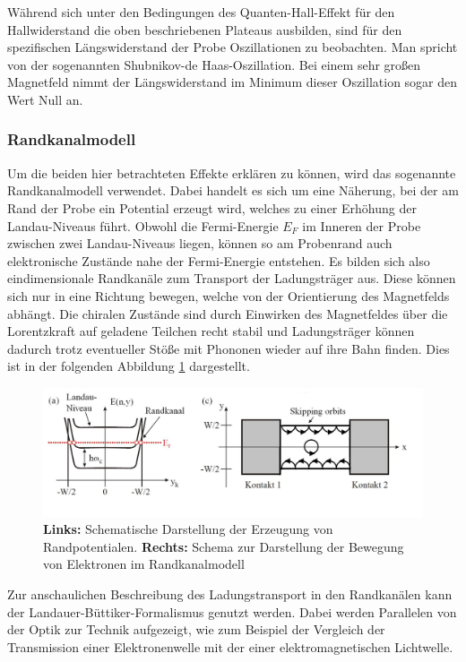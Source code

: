 Während sich unter den Bedingungen des Quanten-Hall-Effekt für den Hallwiderstand die oben beschriebenen Plateaus ausbilden, sind für den spezifischen Längswiderstand der Probe Oszillationen zu beobachten. Man spricht von der sogenannten Shubnikov-de Haas-Oszillation. Bei einem sehr großen Magnetfeld nimmt der Längswiderstand im Minimum dieser Oszillation sogar den Wert Null an.

\subsubsection{Randkanalmodell}

Um die beiden hier betrachteten Effekte erklären zu können, wird das sogenannte Randkanalmodell verwendet. Dabei handelt es sich um eine Näherung, bei der am Rand der Probe ein Potential erzeugt wird, welches zu einer Erhöhung der Landau-Niveaus führt. Obwohl die Fermi-Energie $E_F$ im Inneren der Probe zwischen zwei Landau-Niveaus liegen, können so am Probenrand auch elektronische Zustände nahe der Fermi-Energie entstehen. Es bilden sich also eindimensionale Randkanäle zum Transport der Ladungsträger aus. Diese können sich nur in eine Richtung bewegen, welche von der Orientierung des Magnetfelds abhängt. Die chiralen Zustände sind durch Einwirken des Magnetfeldes über die Lorentzkraft auf geladene Teilchen recht stabil und Ladungsträger können dadurch trotz  eventueller Stöße mit Phononen wieder auf ihre Bahn finden. Dies ist in der folgenden Abbildung \ref{fig:Randkanalmodell_Anleitungsheft} dargestellt.

\begin{figure}[h]
\centering
\includegraphics[width=0.7\linewidth]{images/Anleitungsheft/Randkanalmodell_Anleitungsheft}
\caption[Schema Randkanalmodell]{\textbf{Links:} Schematische Darstellung der Erzeugung von Randpotentialen. \textbf{Rechts:} Schema zur Darstellung der Bewegung von Elektronen im Randkanalmodell}
\label{fig:Randkanalmodell_Anleitungsheft}
\end{figure}

Zur anschaulichen Beschreibung des Ladungstransport in den Randkanälen kann der Landauer-Büttiker-Formalismus genutzt werden. 
Dabei werden Parallelen von der Optik zur Technik aufgezeigt, wie zum Beispiel der Vergleich der Transmission einer Elektronenwelle mit der einer elektromagnetischen Lichtwelle. 

